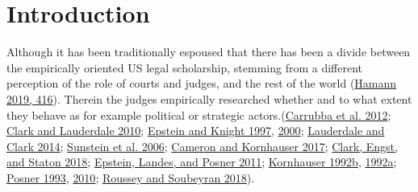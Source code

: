 \documentclass[
  11pt,
]{article}
\begin{document}
\vskip -8.5pt




\setlength{\parindent}{16pt}
\setlength{\parskip}{0pt}

\hypertarget{introduction}{%
\section{Introduction}\label{introduction}}

Although it has been traditionally espoused that there has been a divide
between the empirically oriented US legal scholarship, stemming from a
different perception of the role of courts and judges, and the rest of
the world (\protect\hyperlink{ref-hamannGermanFederalCourts2019}{Hamann
2019, 416}). Therein the judges empirically researched whether and to
what extent they behave as for example political or strategic
actors.(\protect\hyperlink{ref-carrubbaWhoControlsContent2012}{Carrubba
et al. 2012};
\protect\hyperlink{ref-clarkLocatingSupremeCourt2010}{Clark and
Lauderdale 2010};
\protect\hyperlink{ref-epsteinChoicesJusticesMake1997}{Epstein and
Knight 1997},
\protect\hyperlink{ref-epsteinStrategicRevolutionJudicial2000}{2000};
\protect\hyperlink{ref-lauderdaleScalingPoliticallyMeaningful2014}{Lauderdale
and Clark 2014};
\protect\hyperlink{ref-sunsteinAreJudgesPolitical2006}{Sunstein et al.
2006}; \protect\hyperlink{ref-cameronChapterWhatJudges2017}{Cameron and
Kornhauser 2017};
\protect\hyperlink{ref-clarkEstimatingEffectLeisure2018}{Clark, Engst,
and Staton 2018};
\protect\hyperlink{ref-epsteinWhyWhenJudges2011}{Epstein, Landes, and
Posner 2011};
\protect\hyperlink{ref-kornhauserModelingCollegialCourts1992}{Kornhauser
1992b},
\protect\hyperlink{ref-kornhauserModelingCollegialCourts1992a}{1992a};
\protect\hyperlink{ref-posnerWhatJudgesJustices1993}{Posner 1993},
\protect\hyperlink{ref-posnerHowJudgesThink2010}{2010};
\protect\hyperlink{ref-rousseyOverburdenedJudges2018}{Roussey and
Soubeyran 2018}).
\end{document}
